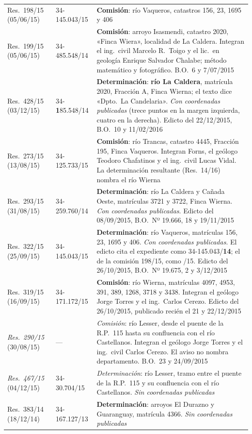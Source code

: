 {\begin{longtable}{@{}p{2.2cm}p{2.9cm}p{6.8cm}@{}}
Res.\ 198/15 (05/06/15) & 34-145.043/15 & \textbf{Comisión}: río Vaqueros, catastros 156, 23, 1695 y 406 \\
Res.\ 199/15 (05/06/15) & 34-485.548/14 & \textbf{Comisión}: arroyo Isasmendi, catastro 2020, «Finca Wiera», localidad de La Caldera. Integran el ing.\ civil Marcelo R.\ Toigo y el lic.\ en geología Enrique Salvador Chalabe; método matemático y fotográfico. B.O.\ 6 y 7/07/2015 \\
Res.\ 428/15 (03/12/15) & 34-\textbf{1}85.548/14 & \textbf{Determinación}: \textbf{río La Caldera}, matrícula 2020, Fracción A, Finca Wierna; el texto dice «Dpto.\ La Candelaria». \textit{Con coordenadas publicadas} (trece puntos en la margen izquierda, cuatro en la derecha). Edicto del 22/12/2015, B.O.\ 10 y 11/02/2016 \\
Res.\ 273/15 (13/08/15) & 34-125.733/15 & \textbf{Comisión}: río Trancas, catastro 4445, Fracción 195, Finca Vaqueros. Integran Forns, el geólogo Teodoro Chafatinos y el ing.\ civil Lucas Vidal. La determinación resultante (Res.\ 14/16) nombra el río Wierna \\
Res.\ 293/15 (31/08/15) & 34-259.760/14 & \textbf{Determinación}: río La Caldera y Cañada Oeste, matrículas 3721 y 3722, Finca Wierna. \textit{Con coordenadas publicadas}. Edicto del 08/09/2015, B.O.\ Nº 19.666, 18 y 19/11/2015 \\
Res.\ 322/15 (25/09/15) & 34-145.043/15 & \textbf{Determinación}: río Vaqueros, matrículas 156, 23, 1695 y 406. \textit{Con coordenadas publicadas}. El edicto cita el expediente como 34-145.043/\textbf{14}; el de la comisión 198/15, como /15. Edicto del 26/10/2015, B.O.\ Nº 19.675, 2 y 3/12/2015 \\
Res.\ 319/15 (16/09/15) & 34-171.172/15 & \textbf{Comisión}: río Wierna, matrículas 4097, 4953, 391, 389, 1268, 3718 y 3438. Integran el geólogo Jorge Torres y el ing.\ Carlos Cerezo. Edicto del 26/10/2015, publicado recién el 21 y 22/12/2015 \\
\textit{Res.\ 290/15} (30/08/15) & --- & \textit{Comisión}: río Lesser, desde el puente de la R.P.\ 115 hasta su confluencia con el río Castellanos. Integran el geólogo Jorge Torres y el ing.\ civil Carlos Cerezo. El aviso no nombra departamento. B.O.\ 23 y 24/09/2015 \\
\textit{Res.\ 467/15} (04/12/15) & 34-30.704/15 & \textit{Determinación}: río Lesser, tramo entre el puente de la R.P.\ 115 y su confluencia con el río Castellanos. \textit{Sin coordenadas publicadas} \\
Res.\ 383/14 (18/12/14) & 34-167.127/13 & \textbf{Determinación}: arroyos El Durazno y Guaranguay, matrícula 4366. \textit{Sin coordenadas publicadas} \\
\bottomrule
\end{longtable}
}

